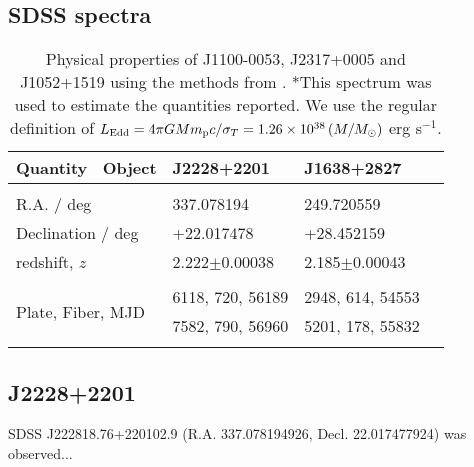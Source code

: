\documentclass[a4paper,fleqn,usenatbib]{mnras}
\begin{document}
\subsection{SDSS spectra}
\begin{table}
 \centering
 \begin{tabular}{l l l l}
  \hline \hline 
   Quantity \ Object                           & J2228+2201     &  J1638+2827 \\
 \hline 
    &&\\
    R.A. / deg                                        &    337.078194      &  249.720559\\
    Declination / deg                            &    +22.017478      &  +28.452159 \\
    redshift, $z$                                    &   2.222$\pm$0.00038   &  2.185$\pm$0.00043          \\
    &&\\ 
    \multirow{2}{*}{Plate, Fiber, MJD}   & 6118, 720, 56189	     &  2948, 614, 54553	  \\
                                         & 7582, 790, 56960	     & 5201, 178, 55832 \\    
    &&\\
    \hline \hline 
  \end{tabular}
  \caption{Physical properties of J1100-0053, J2317+0005 and J1052+1519 using the
    methods from \citet{Shen2011}. *This spectrum was used to estimate
    the quantities reported.  We use the regular definition of $L_{\rm
      Edd} = 4 \pi G M m_{\rm p} c /\sigma_{T} =
    1.26\times10^{38}\left (M/M_{\odot} \right )$ erg s$^{-1}$.} 
 \label{tab:Shen_props}
\end{table}

\subsection{J2228+2201}
SDSS J222818.76+220102.9 (R.A. 337.078194926, Decl. 22.017477924) was observed... 
\end{document}

